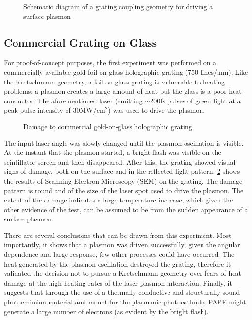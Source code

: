 \begin{figure}
  \centering
  
  \caption[Grating coupling geometry for driving a surface plasmon]{Schematic diagram of a grating coupling geometry for driving a surface plasmon}
  \label{fig:plasmon_schematic}
\end{figure}

\subsection{Commercial Grating on Glass}

For proof-of-concept purposes, the first experiment was performed on a commercially available gold foil on glass holographic grating (750 lines/mm).
Like the Kretschmann geometry, a foil on glass grating is vulnerable to heating problems; a plasmon creates a large amount of heat but the glass is a poor heat conductor.
The aforementioned laser (emitting $\sim$200fs pulses of green light at a peak pulse intensity of 30MW/cm$^2$) was used to drive the plasmon.

\begin{figure}
  \centering
  
  \caption{Damage to commercial gold-on-glass holographic grating}
  \label{fig:grating-damage}
\end{figure}

The input laser angle was slowly changed until the plasmon oscillation is visible.
At the instant that the plasmon started, a bright flash was visible on the scintillator screen and then disappeared.
After this, the grating showed visual signs of damage, both on the surface and in the reflected light pattern.
\ref{fig:grating-damage} shows the results of Scanning Electron Microscopy (SEM) on the grating.
The damage pattern is round and of the size of the laser spot used to drive the plasmon.
The extent of the damage indicates a large temperature increase, which given the other evidence of the test, can be assumed to be from the sudden appearance of a surface plasmon.

There are several conclusions that can be drawn from this experiment.
Most importantly, it shows that a plasmon was driven successfully; given the angular dependence and large response, few other processes could have occurred.
The heat generated by the plasmon oscillation destroyed the grating, therefore it validated the decision not to pursue a Kretschmann geometry over fears of heat damage at the high heating rates of the laser-plasmon interaction.
Finally, it suggests that through the use of a thermally conductive and structurally sound photoemission material and mount for the plasmonic photocathode, PAPE might generate a large number of electrons (as evident by the bright flash).

